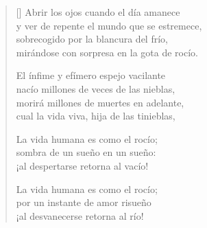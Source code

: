 \documentclass[a4paper,11pt]{letter}
\begin{document}

\settowidth{\versewidth}{y ver de repente el mundo que se estremece,}

\bigskip

\begin{verse}[\versewidth]
Abrir los ojos cuando el día amanece \\
y ver de repente el mundo que se estremece, \\
sobrecogido por la blancura del frío, \\
mirándose con sorpresa en la gota de rocío.

El ínfime y efímero espejo vacilante \\
nacío millones de veces de las nieblas, \\
morirá millones de muertes en adelante, \\
cual la vida viva, hija de las tinieblas,

La vida humana es como el rocío; \\
sombra de un sueño en un sueño: \\
¡al despertarse retorna al vacío!

La vida humana es como el rocío; \\
por un instante de amor risueño \\
¡al desvanecerse retorna al río!
\end{verse}
\end{document}
